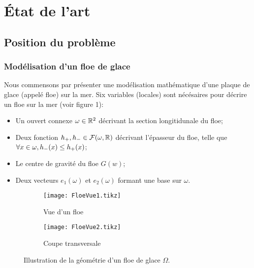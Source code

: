 

\chapter{État de l'art} %

\label{Chapter3} %



\section{Position du problème}

\subsection{Modélisation d'un floe de glace}

Nous commensons par présenter une modélisation mathématique d'une plaque de glace (appelé floe) sur la mer. Six variables (locales) sont nécésaires pour décrire un floe sur la mer (voir figure 1): 
\begin{itemize}
    \item Un ouvert connexe $\omega \in \mathbb{R}^2$ décrivant la section longitidunale du floe;
    \item Deux fonction $h_{+}, h_{-} \in \mathcal{F}(\omega, \mathbb{R})$ décrivant l'épasseur du floe, telle que $\forall x \in \omega, h_{-}(x) \leq h_{+}(x)$;
    \item Le centre de gravité du floe $G(w)$;
    \item Deux vecteurs $e_1(\omega)$ et $e_2(\omega)$ formant une base sur $\omega$.
\end{itemize}

\begin{figure}[H]
    \centering
    \begin{subfigure}[b]{0.45\textwidth}
        \centering
        \texttt{[image: FloeVue1.tikz]} 
        \caption{Vue d'un floe}
    \end{subfigure}
    \begin{subfigure}[b]{0.45\textwidth}
        \centering
        \texttt{[image: FloeVue2.tikz]} 
        \caption{Coupe transversale}
        \label{fig:flo2}
    \end{subfigure}
       \caption{Illustration de la géométrie d'un floe de glace $\Omega$.}
       \label{fig:floe}
\end{figure}

